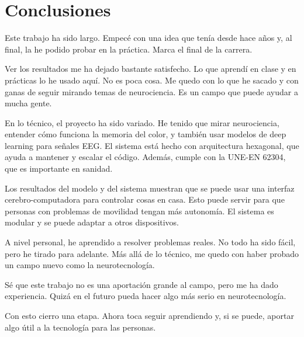 \chapter{Conclusiones}

Este trabajo ha sido largo. Empecé con una idea que tenía desde hace años y, al final, la he podido probar en la práctica. Marca el final de la carrera.

Ver los resultados me ha dejado bastante satisfecho. Lo que aprendí en clase y en prácticas lo he usado aquí. No es poca cosa. Me quedo con lo que he sacado y con ganas de seguir mirando temas de neurociencia. Es un campo que puede ayudar a mucha gente.

En lo técnico, el proyecto ha sido variado. He tenido que mirar neurociencia, entender cómo funciona la memoria del color, y también usar modelos de deep learning para señales EEG. El sistema está hecho con arquitectura hexagonal, que ayuda a mantener y escalar el código. Además, cumple con la UNE-EN 62304, que es importante en sanidad.

Los resultados del modelo y del sistema muestran que se puede usar una interfaz cerebro-computadora para controlar cosas en casa. Esto puede servir para que personas con problemas de movilidad tengan más autonomía. El sistema es modular y se puede adaptar a otros dispositivos.

A nivel personal, he aprendido a resolver problemas reales. No todo ha sido fácil, pero he tirado para adelante. Más allá de lo técnico, me quedo con haber probado un campo nuevo como la neurotecnología.

Sé que este trabajo no es una aportación grande al campo, pero me ha dado experiencia. Quizá en el futuro pueda hacer algo más serio en neurotecnología.

Con esto cierro una etapa. Ahora toca seguir aprendiendo y, si se puede, aportar algo útil a la tecnología para las personas.
